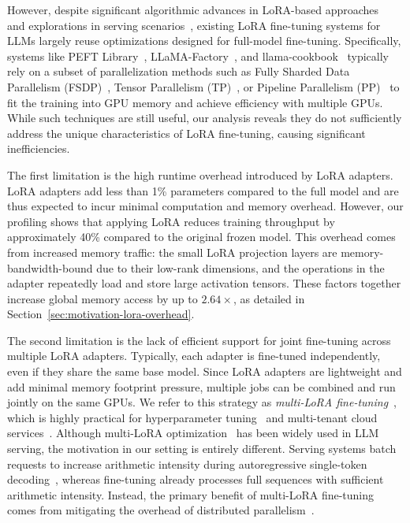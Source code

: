 However, despite significant algorithmic advances in LoRA-based approaches~\cite{dettmers2023qlora,kopiczko2023vera,liu2024dora} and explorations in serving scenarios~\cite{zhou2022pets,chen2024punica,sheng2023s-lora,wu2024dlora}, existing LoRA fine-tuning systems for LLMs largely reuse optimizations designed for full-model fine-tuning.
Specifically, systems like PEFT Library~\cite{peft}, LLaMA-Factory~\cite{zheng2024llamafactory}, and llama-cookbook~\cite{llama-cookbook} typically rely on a subset of parallelization methods such as Fully Sharded Data Parallelism (FSDP)~\cite{pytorch-fsdp,zero}, Tensor Parallelism (TP)~\cite{megatron-1,flexflow}, or Pipeline Parallelism (PP)~\cite{gpipe,pipedream,terapipe} to fit the training into GPU memory and achieve efficiency with multiple GPUs.
While such techniques are still useful, our analysis reveals they do not sufficiently address the unique characteristics of LoRA fine-tuning, causing significant inefficiencies.

The first limitation is the high runtime overhead introduced by LoRA adapters. 
LoRA adapters add less than 1\% parameters compared to the full model and are thus expected to incur minimal computation and memory overhead. 
However, our profiling shows that applying LoRA reduces training throughput by approximately 40\% compared to the original frozen model. 
This overhead comes from increased memory traffic: the small LoRA projection layers are memory-bandwidth-bound due to their low-rank dimensions, and the operations in the adapter repeatedly load and store large activation tensors. 
These factors together increase global memory access by up to $2.64\times$, as detailed in Section~\ref{sec:motivation-lora-overhead}.

The second limitation is the lack of efficient support for joint fine-tuning across multiple LoRA adapters. 
Typically, each adapter is fine-tuned independently, even if they share the same base model. 
Since LoRA adapters are lightweight and add minimal memory footprint pressure, multiple jobs can be combined and run jointly on the same GPUs. 
We refer to this strategy as \textit{multi-LoRA fine-tuning}~\cite{ye2023mlora}, which is highly practical for hyperparameter tuning~\cite{tribes2023hyperparameter-instruction-tuning} and multi-tenant cloud services~\cite{fireworks-fine-tuning,together-ai-fine-tuning}.
Although multi-LoRA optimization~\cite{chen2024punica,sheng2023s-lora,wu2024dlora} has been widely used in LLM serving, the motivation in our setting is entirely different. 
Serving systems batch requests to increase arithmetic intensity during autoregressive single-token decoding~\cite{chen2024punica,sheng2023s-lora}, whereas fine-tuning already processes full sequences with sufficient arithmetic intensity.
Instead, the primary benefit of multi-LoRA fine-tuning comes from mitigating the overhead of distributed parallelism~\cite{ye2023mlora}.

